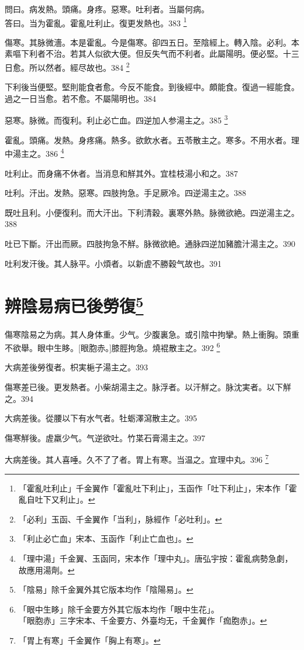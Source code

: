 \documentclass[12pt,twoside,UTF8,b5paper]{ctexbook}
\begin{document}
問曰。病发熱。頭痛。身疼。惡寒。吐利者。当屬何病。\\
答曰。当为霍亂。霍亂吐利止。復更发熱也。383
	\footnote{「霍亂吐利止」千金翼作「霍亂吐下利止」，玉函作「吐下利止」，宋本作「霍亂自吐下又利止」。}

傷寒。其脉微濇。本是霍亂。今是傷寒。卻四五日。至陰經上。轉入陰。必利。本素嘔下利者不治。若其人似欲大便。但反失气而不利者。此屬陽明。便必堅。十三日愈。所以然者。經尽故也。384
	\footnote{「必利」玉函、千金翼作「当利」，脉經作「必吐利」。}

下利後当便堅。堅則能食者愈。今反不能食。到後經中。頗能食。復過一經能食。過之一日当愈。若不愈。不屬陽明也。384

惡寒。脉微。而復利。利止必亡血。四逆加人参湯主之。385
	\footnote{「利止必亡血」宋本、玉函作「利止亡血也」。}

霍亂。頭痛。发熱。身疼痛。熱多。欲飲水者。五苓散主之。寒多。不用水者。理中湯主之。386
	\footnote{「理中湯」千金翼、玉函同，宋本作「理中丸」。唐弘宇按：霍亂病勢急劇，故應用湯劑。}

吐利止。而身痛不休者。当消息和觧其外。宜桂枝湯小和之。387

吐利。汗出。发熱。惡寒。四肢拘急。手足厥冷。四逆湯主之。388

既吐且利。小便復利。而大汗出。下利清穀。裏寒外熱。脉微欲絶。四逆湯主之。388

吐已下斷。汗出而厥。四肢拘急不觧。脉微欲絶。通脉四逆加豬膽汁湯主之。390

吐利发汗後。其人脉平。小煩者。以新虗不勝穀气故也。391

\chapter{辨陰易病已後勞復\footnote{「陰易」除千金翼外其它版本均作「陰陽易」。}}

傷寒陰易之为病。其人身体重。少气。少腹裏急。或引陰中拘攣。熱上衝胸。頭重不欲舉。眼中生眵。[眼胞赤。]膝脛拘急。燒裩散主之。392
	\footnote{「眼中生眵」除千金要方外其它版本均作「眼中生花」。\\「眼胞赤」三字宋本、千金要方、外臺均无，千金翼作「痂胞赤」。}

大病差後勞復者。枳実梔子湯主之。393

傷寒差已後。更发熱者。小柴胡湯主之。脉浮者。以汗觧之。脉沈実者。以下觧之。394

大病差後。從腰以下有水气者。牡蛎澤瀉散主之。395

傷寒觧後。虗羸少气。气逆欲吐。竹枼石膏湯主之。397

大病差後。其人喜唾。久不了了者。胃上有寒。当温之。宜理中丸。396
	\footnote{「胃上有寒」千金翼作「胸上有寒」。}
\end{document}
